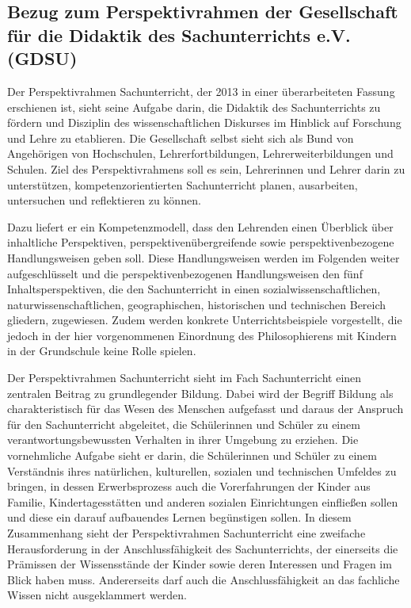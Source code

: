 \newpage
\subsection{Bezug zum Perspektivrahmen der Gesellschaft für die Didaktik des Sachunterrichts  e.V. (GDSU)}

Der Perspektivrahmen Sachunterricht, der 2013 in einer überarbeiteten Fassung erschienen ist, sieht seine Aufgabe darin, die Didaktik des Sachunterrichts zu fördern und Disziplin des wissenschaftlichen Diskurses im Hinblick auf Forschung und Lehre zu etablieren. 
Die Gesellschaft selbst sieht sich als Bund von Angehörigen von Hochschulen, Lehrerfortbildungen, Lehrerweiterbildungen und Schulen. 
Ziel des Perspektivrahmens soll es sein, Lehrerinnen und Lehrer darin zu unterstützen, kompetenzorientierten Sachunterricht planen, ausarbeiten, untersuchen und reflektieren zu können.

Dazu liefert er ein Kompetenzmodell, dass den Lehrenden einen Überblick über inhaltliche Perspektiven, perspektivenübergreifende sowie perspektivenbezogene Handlungsweisen geben soll. 
Diese Handlungsweisen werden im Folgenden weiter aufgeschlüsselt und die perspektivenbezogenen Handlungsweisen den fünf Inhaltsperspektiven, die den Sachunterricht in einen sozialwissenschaftlichen, naturwissenschaftlichen, geographischen, historischen und technischen Bereich gliedern, zugewiesen\cite[S.\,5f]{GDS13}.
 Zudem werden konkrete Unterrichtsbeispiele vorgestellt, die jedoch in der hier vorgenommenen Einordnung des Philosophierens mit Kindern in der Grundschule keine Rolle spielen.
 
Der Perspektivrahmen Sachunterricht sieht im Fach Sachunterricht einen \glqq zentralen Beitrag zu grundlegender Bildung\grqq{}\cite[S.\,9]{GDS13}.
Dabei wird der Begriff Bildung als charakteristisch für das Wesen des Menschen aufgefasst und daraus der Anspruch für den Sachunterricht abgeleitet, die Schülerinnen und Schüler zu einem verantwortungsbewussten Verhalten in ihrer Umgebung zu erziehen. 
Die vornehmliche Aufgabe sieht er darin, die Schülerinnen und Schüler zu einem Verständnis ihres natürlichen, kulturellen, sozialen und technischen Umfeldes zu bringen, in dessen Erwerbsprozess auch die Vorerfahrungen der Kinder aus Familie, Kindertagesstätten und anderen sozialen Einrichtungen einfließen sollen und diese ein darauf aufbauendes Lernen begünstigen sollen. 
In diesem Zusammenhang sieht der Perspektivrahmen Sachunterricht eine zweifache Herausforderung in der Anschlussfähigkeit des Sachunterrichts, der einerseits die Prämissen der Wissensstände der Kinder sowie deren Interessen und Fragen im Blick haben muss. 
Andererseits darf auch die Anschlussfähigkeit an das fachliche Wissen nicht ausgeklammert werden. 

